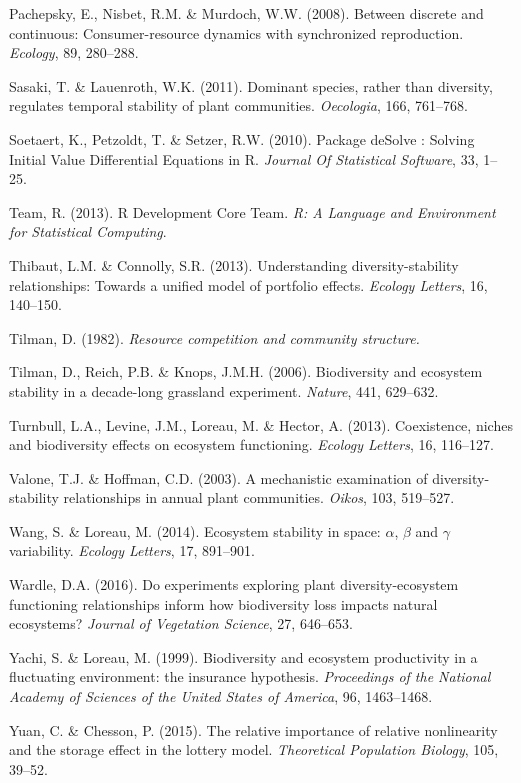 \documentclass[12pt,]{article}
\begin{document}
\hypertarget{ref-Pachepsky2008}{}
Pachepsky, E., Nisbet, R.M. \& Murdoch, W.W. (2008). Between discrete
and continuous: Consumer-resource dynamics with synchronized
reproduction. \emph{Ecology}, 89, 280--288.

\hypertarget{ref-Sasaki2011}{}
Sasaki, T. \& Lauenroth, W.K. (2011). Dominant species, rather than
diversity, regulates temporal stability of plant communities.
\emph{Oecologia}, 166, 761--768.

\hypertarget{ref-Soetaert2010}{}
Soetaert, K., Petzoldt, T. \& Setzer, R.W. (2010). Package deSolve :
Solving Initial Value Differential Equations in R. \emph{Journal Of
Statistical Software}, 33, 1--25.

\hypertarget{ref-Team2013}{}
Team, R. (2013). R Development Core Team. \emph{R: A Language and
Environment for Statistical Computing}.

\hypertarget{ref-Thibaut2013}{}
Thibaut, L.M. \& Connolly, S.R. (2013). Understanding
diversity-stability relationships: Towards a unified model of portfolio
effects. \emph{Ecology Letters}, 16, 140--150.

\hypertarget{ref-Tilman1982}{}
Tilman, D. (1982). \emph{Resource competition and community structure.}

\hypertarget{ref-Tilman2006}{}
Tilman, D., Reich, P.B. \& Knops, J.M.H. (2006). Biodiversity and
ecosystem stability in a decade-long grassland experiment.
\emph{Nature}, 441, 629--632.

\hypertarget{ref-Turnbull2013}{}
Turnbull, L.A., Levine, J.M., Loreau, M. \& Hector, A. (2013).
Coexistence, niches and biodiversity effects on ecosystem functioning.
\emph{Ecology Letters}, 16, 116--127.

\hypertarget{ref-Valone2003}{}
Valone, T.J. \& Hoffman, C.D. (2003). A mechanistic examination of
diversity-stability relationships in annual plant communities.
\emph{Oikos}, 103, 519--527.

\hypertarget{ref-Wang2014}{}
Wang, S. \& Loreau, M. (2014). Ecosystem stability in space: \(\alpha\),
\(\beta\) and \(\gamma\) variability. \emph{Ecology Letters}, 17,
891--901.

\hypertarget{ref-Wardle2016}{}
Wardle, D.A. (2016). Do experiments exploring plant diversity-ecosystem
functioning relationships inform how biodiversity loss impacts natural
ecosystems? \emph{Journal of Vegetation Science}, 27, 646--653.

\hypertarget{ref-Yachi1999}{}
Yachi, S. \& Loreau, M. (1999). Biodiversity and ecosystem productivity
in a fluctuating environment: the insurance hypothesis.
\emph{Proceedings of the National Academy of Sciences of the United
States of America}, 96, 1463--1468.

\hypertarget{ref-Yuan2015}{}
Yuan, C. \& Chesson, P. (2015). The relative importance of relative
nonlinearity and the storage effect in the lottery model.
\emph{Theoretical Population Biology}, 105, 39--52.
\end{document}
